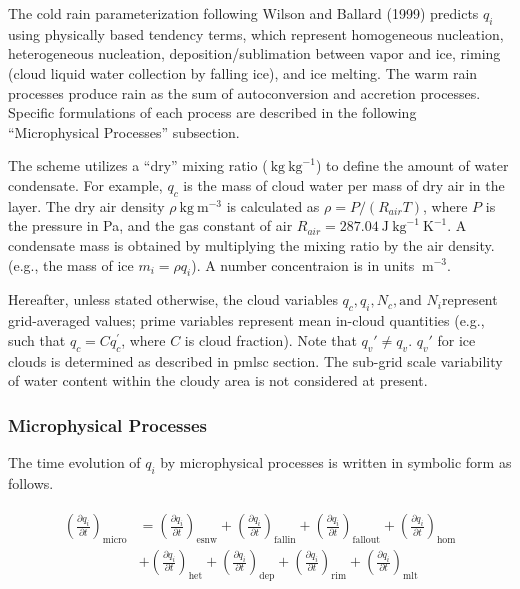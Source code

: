 The cold rain parameterization following Wilson and Ballard (1999)
predicts \(q_i\) using physically based tendency terms, which represent
homogeneous nucleation, heterogeneous nucleation, deposition/sublimation
between vapor and ice, riming (cloud liquid water collection by falling
ice), and ice melting. The warm rain processes produce rain as the sum
of autoconversion and accretion processes. Specific formulations of each
process are described in the following ``Microphysical Processes''
subsection.

The scheme utilizes a ``dry'' mixing ratio
(\(\mathrm{~kg} \mathrm{~kg}^{-1}\)) to define the amount of water
condensate. For example, \(q_c\) is the mass of cloud water per mass of
dry air in the layer. The dry air density
\(\rho \mathrm{~kg} \mathrm{~m}^{-3}\) is calculated as
\(\rho =P/(R_{air}T)\), where \(P\) is the pressure in Pa, and the gas
constant of air
\(R_{air} =287.04 \mathrm{~J} \mathrm{~kg}^{-1} \mathrm{~K}^{-1}\). A
condensate mass is obtained by multiplying the mixing ratio by the air
density. (e.g., the mass of ice \(m_i = \rho q_i\)). A number
concentraion is in units \(\mathrm{~m}^{-3}\).

Hereafter, unless stated otherwise, the cloud variables
\(q_c, q_i,N_c, \text{and } N_i\)represent grid-averaged values; prime
variables represent mean in-cloud quantities (e.g., such that
\(q_c = C q_c^{'}\), where \(C\) is cloud fraction). Note that
\(q_v{'} \neq q_v\). \(q_v{'}\) for ice clouds is determined as
described in pmlsc section. The sub-grid scale variability of water
content within the cloudy area is not considered at present.

\hypertarget{microphysical-processes}{%
\subsubsection{Microphysical Processes}\label{microphysical-processes}}

The time evolution of \(q_i\) by microphysical processes is written in
symbolic form as follows.

\begin{eqnarray}
\begin{split}
\left(\frac{\partial q_i}{\partial t}\right)_{\text {micro}}
&=\left(\frac{\partial q_i}{\partial t}\right)_{\text {esnw}}
+\left(\frac{\partial q_i}{\partial t}\right)_{\text {fallin}}
+\left(\frac{\partial q_i}{\partial t}\right)_{\text {fallout}}
+\left(\frac{\partial q_i}{\partial t}\right)_{\text {hom}}\\
&+\left(\frac{\partial q_i}{\partial t}\right)_{\text {het}}
+\left(\frac{\partial q_i}{\partial t}\right)_{\text {dep}}
+\left(\frac{\partial q_i}{\partial t}\right)_{\text {rim}}
+\left(\frac{\partial q_i}{\partial t}\right)_{\text {mlt}}
\end{split}
\end{eqnarray}

